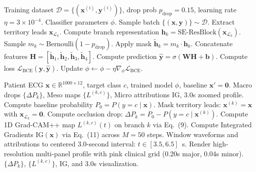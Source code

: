 \documentclass[5p,twocolumn,10pt]{elsarticle}
\begin{document}
\begin{algorithm}[t]
\caption{Anatomical Territory-Dropout Classifier Training}
\label{alg:classifier_training}
\begin{algorithmic}[1]
\REQUIRE Training dataset $\mathcal{D} = \{(\mathbf{x}^{(i)}, \mathbf{y}^{(i)})\}$, drop prob $p_{\text{drop}} = 0.15$, learning rate $\eta = 3\times 10^{-4}$.
\ENSURE Classifier parameters $\phi$.
    \STATE Sample batch $\{(\mathbf{x}, \mathbf{y})\} \sim \mathcal{D}$.
        \STATE Extract territory leads $\mathbf{x}_{\mathcal{L}_k}$.
        \STATE Compute branch representation $\mathbf{h}_k = \text{SE-ResBlock}(\mathbf{x}_{\mathcal{L}_k})$.
        \STATE Sample $m_k \sim \text{Bernoulli}(1 - p_{\text{drop}})$.
        \STATE Apply mask $\tilde{\mathbf{h}}_k = m_k \cdot \mathbf{h}_k$.
    \ENDFOR
    \STATE Concatenate features $\mathbf{H} = [\tilde{\mathbf{h}}_1, \tilde{\mathbf{h}}_2, \tilde{\mathbf{h}}_3, \tilde{\mathbf{h}}_4]$.
    \STATE Compute prediction $\hat{\mathbf{y}} = \sigma(\mathbf{W} \mathbf{H} + \mathbf{b})$.
    \STATE Compute loss $\mathcal{L}_{\text{BCE}}(\mathbf{y}, \hat{\mathbf{y}})$.
    \STATE Update $\phi \leftarrow \phi - \eta \nabla_\phi \mathcal{L}_{\text{BCE}}$.
\ENDWHILE
\end{algorithmic}
\end{algorithm}

\begin{algorithm}[t]
\caption{Multi-Scale Anatomical Attribution Inference}
\label{alg:xai_inference}
\begin{algorithmic}[1]
\REQUIRE Patient ECG $\mathbf{x} \in \mathbb{R}^{1000 \times 12}$, target class $c$, trained model $\phi$, baseline $\mathbf{x}' = \mathbf{0}$.
\ENSURE Macro drops $\{\Delta P_k\}$, Meso maps $\{L^{(k, c)}\}$, Micro attributions $\text{IG}$, 3.0s zoomed profile.
\STATE Compute baseline probability $P_0 = P(y = c \mid \mathbf{x})$.
    \STATE Mask territory leads: $\mathbf{x}^{(k)} = \mathbf{x}$ with $\mathbf{x}_{\mathcal{L}_k} = \mathbf{0}$.
    \STATE Compute occlusion drop: $\Delta P_k = P_0 - P(y = c \mid \mathbf{x}^{(k)})$.
    \STATE Compute 1D Grad-CAM++ map $L^{(k, c)}(t)$ on branch $k$ via Eq.~(9).
\ENDFOR
\STATE Compute Integrated Gradients $\text{IG}(\mathbf{x})$ via Eq.~(11) across $M=50$ steps.
\STATE Window waveforms and attributions to centered 3.0-second interval: $t \in [3.5, 6.5]$~s.
\STATE Render high-resolution multi-panel profile with pink clinical grid (0.20s major, 0.04s minor).
\RETURN $\{\Delta P_k\}$, $\{L^{(k, c)}\}$, $\text{IG}$, and 3.0s visualization.
\end{algorithmic}
\end{algorithm}
\end{document}
